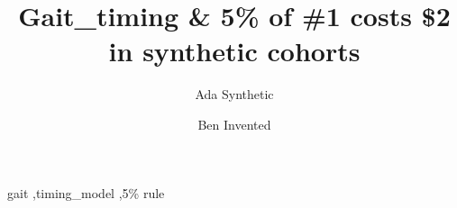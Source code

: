 \documentclass{elsarticle}
\begin{document}
\begin{frontmatter}
\title{Gait\_timing \& 5\% of \#1 costs \$2 in synthetic cohorts}
\author[1]{Ada Synthetic}
\author[1,2]{Ben Invented}
\begin{abstract}

\end{abstract}
\begin{keyword}
gait \sep timing\_model \sep 5\% rule
\end{keyword}
\end{frontmatter}






\end{document}
